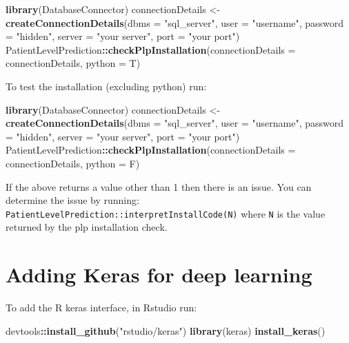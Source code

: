 \documentclass[]{article}
\newenvironment{Shaded}{\begin{snugshade}}{\end{snugshade}}
\newcommand{\KeywordTok}[1]{\textcolor[rgb]{0.13,0.29,0.53}{\textbf{#1}}}
\newcommand{\DataTypeTok}[1]{\textcolor[rgb]{0.13,0.29,0.53}{#1}}
\newcommand{\StringTok}[1]{\textcolor[rgb]{0.31,0.60,0.02}{#1}}
\newcommand{\OperatorTok}[1]{\textcolor[rgb]{0.81,0.36,0.00}{\textbf{#1}}}
\newcommand{\NormalTok}[1]{#1}
\begin{document}
\begin{Shaded}
\begin{Highlighting}[]
\KeywordTok{library}\NormalTok{(DatabaseConnector)}
\NormalTok{connectionDetails <-}\StringTok{ }\KeywordTok{createConnectionDetails}\NormalTok{(}\DataTypeTok{dbms =} \StringTok{"sql_server"}\NormalTok{, }\DataTypeTok{user =} \StringTok{"username"}\NormalTok{, }
    \DataTypeTok{password =} \StringTok{"hidden"}\NormalTok{, }\DataTypeTok{server =} \StringTok{"your server"}\NormalTok{, }\DataTypeTok{port =} \StringTok{"your port"}\NormalTok{)}
\NormalTok{PatientLevelPrediction}\OperatorTok{::}\KeywordTok{checkPlpInstallation}\NormalTok{(}\DataTypeTok{connectionDetails =}\NormalTok{ connectionDetails, }
    \DataTypeTok{python =}\NormalTok{ T)}
\end{Highlighting}
\end{Shaded}

To test the installation (excluding python) run:

\begin{Shaded}
\begin{Highlighting}[]
\KeywordTok{library}\NormalTok{(DatabaseConnector)}
\NormalTok{connectionDetails <-}\StringTok{ }\KeywordTok{createConnectionDetails}\NormalTok{(}\DataTypeTok{dbms =} \StringTok{"sql_server"}\NormalTok{, }\DataTypeTok{user =} \StringTok{"username"}\NormalTok{, }
    \DataTypeTok{password =} \StringTok{"hidden"}\NormalTok{, }\DataTypeTok{server =} \StringTok{"your server"}\NormalTok{, }\DataTypeTok{port =} \StringTok{"your port"}\NormalTok{)}
\NormalTok{PatientLevelPrediction}\OperatorTok{::}\KeywordTok{checkPlpInstallation}\NormalTok{(}\DataTypeTok{connectionDetails =}\NormalTok{ connectionDetails, }
    \DataTypeTok{python =}\NormalTok{ F)}
\end{Highlighting}
\end{Shaded}

If the above returns a value other than 1 then there is an issue. You
can determine the issue by running:
\texttt{PatientLevelPrediction::interpretInstallCode(N)} where
\texttt{N} is the value returned by the plp installation check.

\section{Adding Keras for deep
learning}\label{adding-keras-for-deep-learning}

To add the R keras interface, in Rstudio run:

\begin{Shaded}
\begin{Highlighting}[]
\NormalTok{devtools}\OperatorTok{::}\KeywordTok{install_github}\NormalTok{(}\StringTok{"rstudio/keras"}\NormalTok{)}
\KeywordTok{library}\NormalTok{(keras)}
\KeywordTok{install_keras}\NormalTok{()}
\end{Highlighting}
\end{Shaded}
\end{document}
